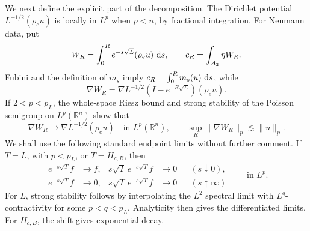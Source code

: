 \documentclass[12pt]{amsart}
\newcommand\dd{\,{\rm d}}
\theoremstyle{remark}
\begin{document}
We next define the explicit part of the decomposition.  The Dirichlet
potential \(L^{-1/2}(\rho_eu)\) is locally in \(L^p\) when \(p<n\), by
fractional integration.  For Neumann data, put
\[
 W_R=\int_0^R e^{-s\sqrt L}(\rho_eu)\,\dd s,\qquad
 c_R=\int_{\mathcal A_2}\eta W_R .
\]
Fubini and the definition of \(m_s\) imply
\(c_R=\int_0^Rm_s(u)\,\dd s\), while
\[
 \nabla W_R
 =\nabla L^{-1/2}(I-e^{-R\sqrt L})(\rho_eu).
\]
If \(2<p<p_L\), the whole-space Riesz bound and strong stability of the
Poisson semigroup on \(L^p(\mathbb R^n)\) show that
\begin{equation}\label{eq:WR-gradient-limit}
 \nabla W_R\longrightarrow
 \nabla L^{-1/2}(\rho_eu)\quad\text{in }L^p(\mathbb R^n),\qquad
 \sup_R\|\nabla W_R\|_p\lesssim\|u\|_p .
\end{equation}
We shall use the following standard endpoint limits without further
comment.  If \(T=L\), with \(p<p_L\), or \(T=H_{c,B}\), then
\begin{equation}\label{eq:model-Poisson-endpoints}
 \begin{aligned}
 e^{-s\sqrt T}f&\longrightarrow f,&
 s\sqrt T\,e^{-s\sqrt T}f&\longrightarrow0&& (s\downarrow0),\\
 e^{-s\sqrt T}f&\longrightarrow0,&
 s\sqrt T\,e^{-s\sqrt T}f&\longrightarrow0&& (s\uparrow\infty)
 \end{aligned}
 \qquad\text{in }L^p.
\end{equation}
For \(L\), strong stability follows by interpolating the \(L^2\) spectral
limit with \(L^q\)-contractivity for some \(p<q<p_L\).  Analyticity then
gives the differentiated limits.  For \(H_{c,B}\), the shift gives
exponential decay.

\end{document}
